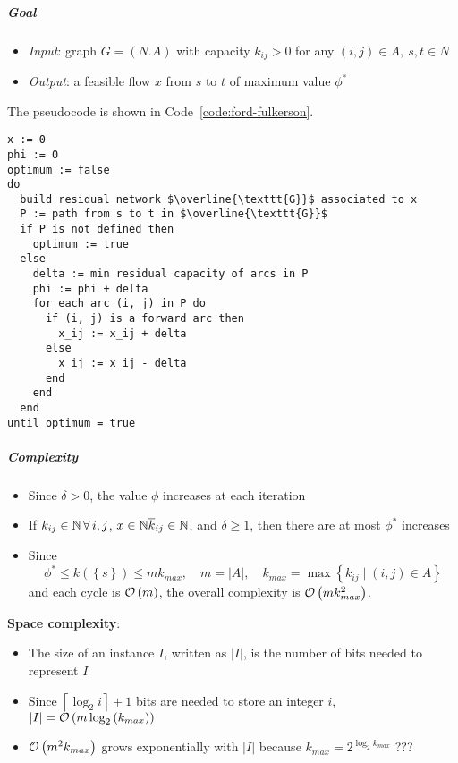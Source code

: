 \documentclass[english]{article}
\begin{document}
\subparagraph*{Goal}
\begin{itemize}[label=\(\rightarrow\)]
  \item \textit{Input}: graph \(G = (N. A)\) with capacity \(k_{ij} > 0\) for any \((i, j) \in A, \ s,t \in N\)
  \item \textit{Output}: a feasible flow \(x\) from \(s\) to \(t\) of maximum value \(\phi^\ast\)
\end{itemize}

The pseudocode is shown in Code~\ref{code:ford-fulkerson}.

\begin{lstlisting}[caption={Ford-Fulkerson algorithm}, label={code:ford-fulkerson}]
x := 0
phi := 0
optimum := false
do
  build residual network $\overline{\texttt{G}}$ associated to x
  P := path from s to t in $\overline{\texttt{G}}$
  if P is not defined then
    optimum := true
  else
    delta := min residual capacity of arcs in P
    phi := phi + delta
    for each arc (i, j) in P do
      if (i, j) is a forward arc then
        x_ij := x_ij + delta
      else
        x_ij := x_ij - delta
      end
    end
  end
until optimum = true
\end{lstlisting}

\subparagraph*{Complexity}
\begin{itemize}
  \item Since \(\delta > 0\), the value \(\phi\) increases at each iteration
  \item If \(k_{ij} \in \mathbb{N} \, \forall \, i, j\), \(x \in \mathbb{N}\overline{k}_{ij} \in \mathbb{N}\), and \(\delta \geq 1\), then there are at most \(\phi^\ast\) increases
  \item Since
        \[ \phi^\ast \leq k\left( \left\{ s \right\} \right) \leq m k_{max}, \quad m = |A|, \quad k_{max} = \max\left\{ k_{ij} \mid \left( i, j \right) \in A \right\} \]
        and each cycle is \(\mathcal{O}\left(m\right)\), the overall complexity is \(\mathcal{O}\left(m k_{max}^2\right)\).
\end{itemize}

\textbf{Space complexity}:
\begin{itemize}
  \item The size of an instance \(I\), written as \(|I|\), is the number of bits needed to represent \(I\)
  \item Since \(\left\lceil{\log_2{i}}\right\rceil + 1\) bits are needed to store an integer \(i\), \(|I| = \mathcal{O}\left(m \log_2{\left( k_{max} \right)}\right)\)
  \item \(\mathcal{O}\left(m^2 k_{max}\right)\) grows exponentially with \(|I|\) because \(k_{max} = 2^{\log_2{k_{max}}}\) ??? %
\end{itemize}
\end{document}
